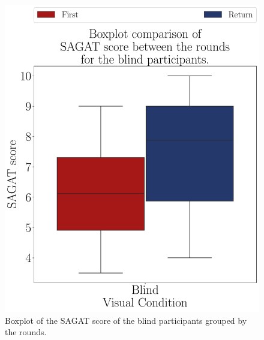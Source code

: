 \begin{figure}[!htb]
    \centering
    \includegraphics[width = 0.75\linewidth]{Resultados/Sagat/Figuras/pdf/boxplot_sagat_blind_rounds.pdf}
    \caption{Boxplot of the SAGAT score of the blind participants grouped by the rounds.}
    \label{fig:boxplot_sagat_blind_rounds}
\end{figure}



